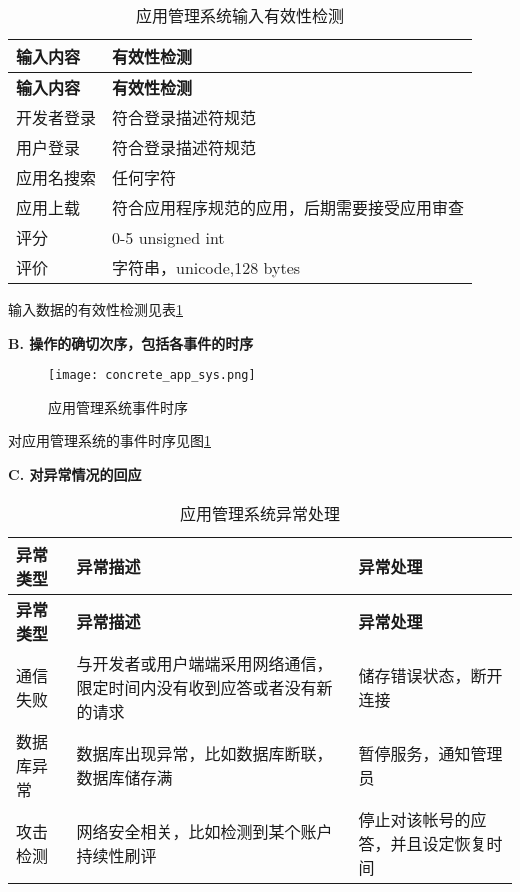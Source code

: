 \begin{longtable}{|p{3cm}|p{11cm}|}
\caption{应用管理系统输入有效性检测}\label{tab:concrete_app_sys_input_valid} \\
\hline
\textbf{输入内容} & \textbf{有效性检测}    \\
\hline
\endfirsthead
\hline
\textbf{输入内容} & \textbf{有效性检测}   \\
\hline
\endhead
\hline 
\endfoot
\hline
\endlastfoot
开发者登录 & 符合登录描述符规范 \\
用户登录 & 符合登录描述符规范 \\
应用名搜索 & 任何字符 \\
应用上载 & 符合应用程序规范的应用，后期需要接受应用审查 \\
评分 & 0-5 unsigned int \\
评价 & 字符串，unicode,128 bytes \\
\end{longtable}
	
输入数据的有效性检测见表\ref{tab:concrete_app_sys_input_valid}


\textbf{B. 操作的确切次序，包括各事件的时序}

\begin{figure}[ht]
	\centering
	\texttt{[image: concrete\_app\_sys.png]}
	\caption{应用管理系统事件时序} \label{fig:concrete_app_sys}
\end{figure}

对应用管理系统的事件时序见图\ref{fig:concrete_app_sys}

\textbf{C. 对异常情况的回应}

\begin{longtable}{|p{3cm}|p{5cm}|p{6cm}|}
\caption{应用管理系统异常处理}\label{tab:concrete_app_sys_exception} \\
\hline
\textbf{异常类型} & \textbf{异常描述} & \textbf{异常处理}\\
\hline
\endfirsthead
\hline
\textbf{异常类型} & \textbf{异常描述} & \textbf{异常处理}\\
\hline
\endhead
\hline 
\endfoot
\hline
\endlastfoot
通信失败 & 
与开发者或用户端端采用网络通信，限定时间内没有收到应答或者没有新的请求 &
储存错误状态，断开连接\\
数据库异常 & 数据库出现异常，比如数据库断联，数据库储存满 &
暂停服务，通知管理员\\
攻击检测 & 网络安全相关，比如检测到某个账户持续性刷评 &
停止对该帐号的应答，并且设定恢复时间\\
\end{longtable}

